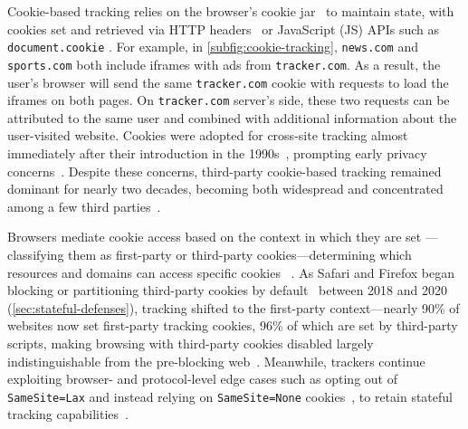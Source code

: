 Cookie-based tracking relies on the browser's cookie jar \symStorage\ to maintain state, with cookies set and retrieved via HTTP headers \symSharing\ or JavaScript (JS) APIs such as \texttt{document.cookie} \symExecution.
%
For example, in \autoref{subfig:cookie-tracking}, \texttt{news.com} and \texttt{sports.com} both include iframes with ads from \texttt{tracker.com}.
%
As a result, the user’s browser will send the same \texttt{tracker.com} cookie with requests to load the iframes on both pages.
%
On \texttt{tracker.com} server's side, these two requests can be attributed to the same user and combined with additional information about the user-visited website.
Cookies were adopted for cross-site tracking almost immediately after their introduction in the 1990s~\cite{montulliHTTPStateManagement1997}, prompting early privacy concerns~\cite{kristolHTTPCookiesStandards2001,SenatorRaisesPrivacy2001}.
%
Despite these concerns, third-party cookie-based tracking remained dominant for nearly two decades, becoming both widespread and concentrated among a few third parties~\cite{krishnamurthyPrivacyDiffusionWeb2009,lernerInternetJonesRaiders2016,englehardtOnlineTracking1millionsite2016,yuTrackingTrackers2016,karajWhoTracksMeShedding2019}.

Browsers mediate cookie access based on the context in which they are set
---classifying them as first-party or third-party cookies---determining which resources and domains can access specific cookies
~\cite{beugin2024WebAlmanac2024,singhIncoherenciesWebBrowser2010,mdnSameoriginPolicySecurity2024}.
%
As Safari and Firefox began blocking or partitioning third-party cookies by default~\cite{TrackingPreventionWebKit2020,mdnThirdpartyCookiesPrivacy2024}  between 2018 and 2020 (\autoref{sec:stateful-defenses}), tracking shifted to the first-party context---nearly 90\% of websites now set first-party tracking cookies, 96\% of which are set by third-party scripts, making browsing with third-party cookies disabled largely indistinguishable from the pre-blocking web~\cite{munirCookieGraphUnderstandingDetecting2023,vekaria2024WebAlmanac2024,linBrowsingThirdPartyCookies2024}.
%
Meanwhile, trackers continue exploiting browser- and protocol-level edge cases such as opting out of \texttt{SameSite=Lax} and instead relying on \texttt{SameSite=None} cookies~\cite{khodayariStateSameSiteStudying2022}, to retain stateful tracking capabilities~\cite{bashirHowTrackingCompanies2018}.



